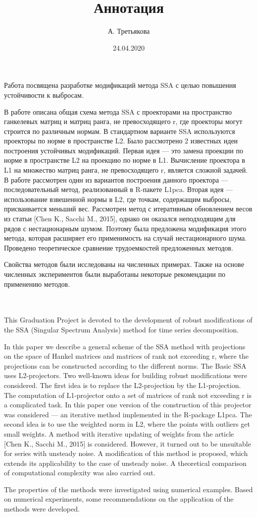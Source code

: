 \documentclass[12pt]{article}
\title{Аннотация}
\author{А. Третьякова}
\date{24.04.2020}
\begin{document}
  
Работа посвящена разработке модификаций метода SSA с целью повышения устойчивости к выбросам. 

В работе описана общая схема метода SSA с проекторами на пространство ганкелевых матриц и матриц ранга, не превосходящего r,
где проекторы могут строится по различным нормам. В стандартном варианте SSA используются проекторы по норме в пространстве L2.
Было рассмотрено 2 известных идеи построения устойчивых модификаций. Первая идея --- это замена проекции по норме в пространстве L2 на проекцию по норме в L1. 
Вычисление проектора в L1 на множество матриц ранга, не превосходящего r, является сложной задачей. 
В работе рассмотрен один из вариантов построения данного проектора --- последовательный метод, 
реализованный в R-пакете L1pca. Вторая идея --- использование взвешенной нормы в L2, где точкам, содержащим выбросы, присваивается меньший вес.
Рассмотрен метод с итеративным обновлением весов из статьи [Chen K., Sacchi M., 2015], однако он оказался неподходящим для рядов с нестационарным шумом. Поэтому была 
предложена модификация этого метода, которая расширяет его применимость на случай нестационарного шума. Проведено теоретическое сравнение трудоемкостей
предложенных методов.

Свойства методов были исследованы на численных примерах. Также на основе численных экспериментов были выработаны некоторые рекомендации по применению методов. 

~~~\\
~~~\\


This Graduation Project is devoted to the development of robust modifications of the SSA (Singular Spectrum Analysis) method for time series decomposition. 

In this paper we describe a general scheme of the SSA method with projections on the space of Hankel matrices and matrices of rank not exceeding r,
where the projections can be constructed according to the different norms. The Basic SSA uses L2-projectors. Two well-known ideas for building 
robust modifications were considered.
The first idea is to replace the L2-projection by the L1-projection. The computation of L1-projector onto a set of matrices of rank not exceeding r 
is a complicated task. In this paper one version of the construction of this projector was considered --- an iterative method implemented in the R-package L1pca.
The second idea is to use the weighted norm in L2, where the points with outliers get small weights.
A method with iterative updating of weights from the article [Chen K., Sacchi M., 2015] is considered. However, it turned out to be unsuitable for series with unsteady noise. 
A modification of this method is proposed, which extends its applicability to the case of unsteady noise. A theoretical comparison of computational complexity was also carried out.

The properties of the methods were investigated using numerical examples. Based on numerical experiments,
some recommendations on the application of the methods were developed.
 
    
\end{document}
